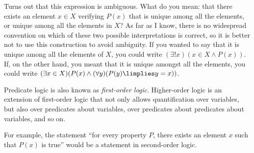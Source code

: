 \begin{para} Turns out that this expression is ambiguous. What do you mean: that there exists an element $x\in X$ verifying $P(x)$ that is unique among all the elements, or unique among all the elements in $X$? As far as I know, there is no widespread convention on which of these two possible interpretations is correct, so it is better not to use this construction to avoid ambiguity.
If you wanted to say that it is unique among all the elements of $X$, you could write $(\exists! x)(x\in X \land P(x))$. If, on the other hand, you meant that it is unique amongst all the elements, you could write $(\exists x\in X)(P(x)\land (\forall y)(P(y)\limplies y =x))$.
\end{para}

\begin{para}
Predicate logic is also known as \emph{first-order logic}. Higher-order logic is an extension of first-order logic that not only allows quantification over variables, but also over predicates about variables, over predicates about predicates about variables, and so on.

For example, the statement ``for every property $P$, there exists an element $x$ such that $P(x)$ is true'' would be a statement in second-order logic. 
\end{para}

